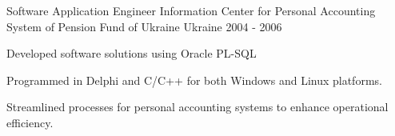 \begin{cventries}
\cventry
  {Software Application Engineer} %
  {Information Center for Personal Accounting System of Pension Fund of Ukraine} %
  {Ukraine} %
  {2004 - 2006} %
  {
    \begin{cvitems} %
      \item {Developed software solutions using Oracle PL-SQL}
      \item {Programmed in Delphi and C/C++ for both Windows and Linux platforms.}
      \item {Streamlined processes for personal accounting systems to enhance operational efficiency.}
    \end{cvitems}
  } 

\end{cventries}
